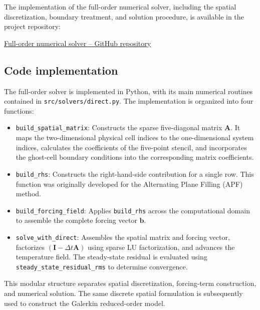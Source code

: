 The implementation of the full-order numerical solver,
including the spatial discretization, boundary treatment,
and solution procedure, is available in the project
repository:

\begin{center}
    \href{
    https://github.com/Arian-Shahnoori/CFD/tree/main/CFD_Project_03
    }{
    Full-order numerical solver -- GitHub repository
    }
\end{center}

\subsection{Code implementation}

The full-order solver is implemented in Python, with its main
numerical routines contained in \texttt{src/solvers/direct.py}.
The implementation is organized into four functions:

\begin{itemize}
    \item \texttt{build\_spatial\_matrix}: Constructs the sparse
    five-diagonal matrix $\mathbf{A}$. It maps the two-dimensional
    physical cell indices to the one-dimensional system indices,
    calculates the coefficients of the five-point stencil, and
    incorporates the ghost-cell boundary conditions into the
    corresponding matrix coefficients.

    \item \texttt{build\_rhs}: Constructs the right-hand-side
    contribution for a single row. This function was originally
    developed for the Alternating Plane Filling (APF) method.

    \item \texttt{build\_forcing\_field}: Applies
    \texttt{build\_rhs} across the computational domain to
    assemble the complete forcing vector $\mathbf{b}$.

    \item \texttt{solve\_with\_direct}: Assembles the spatial
    matrix and forcing vector, factorizes
    $(\mathbf{I}-\Delta t\mathbf{A})$ using sparse LU
    factorization, and advances the temperature field.
    The steady-state residual is evaluated using
    \texttt{steady\_state\_residual\_rms} to determine
    convergence.
\end{itemize}

This modular structure separates spatial discretization,
forcing-term construction, and numerical solution. The same
discrete spatial formulation is subsequently used to construct
the Galerkin reduced-order model.